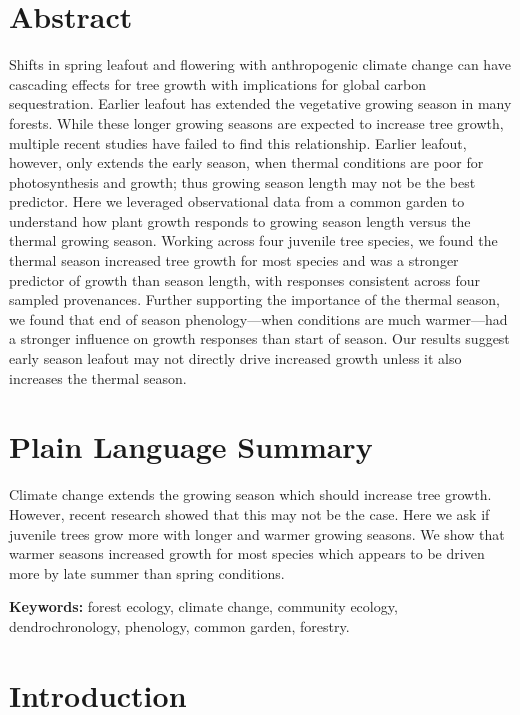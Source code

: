 \documentclass{article}\usepackage[]{graphicx}\usepackage[]{xcolor}
\begin{document}
\section{Abstract}
Shifts in spring leafout and flowering with anthropogenic climate change can have cascading effects for tree growth with implications for global carbon sequestration. Earlier leafout has extended the vegetative growing season in many forests. While these longer growing seasons are expected to increase tree growth, multiple recent studies have failed to find this relationship. Earlier leafout, however, only extends the early season, when thermal conditions are poor for photosynthesis and growth; thus growing season length may not be the best predictor. Here we leveraged observational data from a common garden to understand how plant growth responds to growing season length versus the thermal growing season. Working across four juvenile tree species, we found the thermal season increased tree growth for most species and was a stronger predictor of growth than season length, with responses consistent across four sampled provenances. Further supporting the importance of the thermal season, we found that end of season phenology---when conditions are much warmer---had a stronger influence on growth responses than start of season. Our results suggest early season leafout may not directly drive increased growth unless it also increases the thermal season. 

\section*{Plain Language Summary}
Climate change extends the growing season which should increase tree growth. However, recent research showed that this may not be the case. Here we ask if juvenile trees grow more with longer and warmer growing seasons. We show that warmer seasons increased growth for most species which appears to be driven more by late summer than spring conditions. 

\textbf{Keywords:} forest ecology, climate change, community ecology, dendrochronology, phenology, common garden, forestry.

\section{Introduction}
\end{document}
